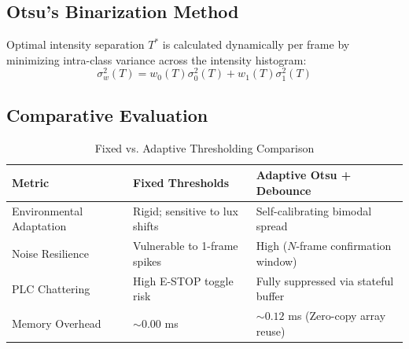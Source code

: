 \documentclass[10pt,journal,compsoc]{IEEEtran}
\begin{document}
\subsection{Otsu's Binarization Method}
Optimal intensity separation $T^*$ is calculated dynamically per frame by minimizing intra-class variance across the intensity histogram:
\begin{equation}
\sigma_w^2(T) = w_0(T)\sigma_0^2(T) + w_1(T)\sigma_1^2(T)
\end{equation}

\subsection{Comparative Evaluation}
\begin{table}[h!]
\centering
\begin{tabular}{|l|p{4.5cm}|p{5cm}|}
\hline
\textbf{Metric} & \textbf{Fixed Thresholds} & \textbf{Adaptive Otsu + Debounce} \\ \hline
Environmental Adaptation & Rigid; sensitive to lux shifts & Self-calibrating bimodal spread \\ \hline
Noise Resilience & Vulnerable to 1-frame spikes & High ($N$-frame confirmation window) \\ \hline
PLC Chattering & High E-STOP toggle risk & Fully suppressed via stateful buffer \\ \hline
Memory Overhead & $\sim 0.00$ ms & $\sim 0.12$ ms (Zero-copy array reuse) \\ \hline
\end{tabular}
\caption{Fixed vs. Adaptive Thresholding Comparison}
\label{tab:threshold_comparison}
\end{table}
\end{document}
